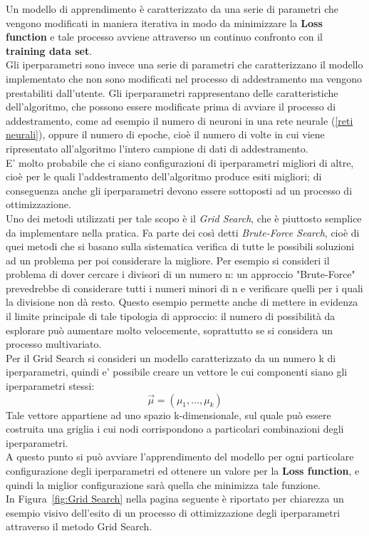 Un modello di apprendimento è caratterizzato da una serie di parametri che vengono modificati in maniera iterativa in modo da minimizzare la \textbf{Loss function} e tale processo avviene attraverso un continuo confronto con il \textbf{training data set}.\\ 
Gli iperparametri sono invece una serie di parametri che caratterizzano il modello implementato che non sono modificati nel processo di addestramento ma vengono prestabiliti dall'utente. Gli iperparametri rappresentano delle caratteristiche dell'algoritmo, che possono essere modificate prima di avviare il processo di addestramento, come ad esempio il numero di neuroni in una rete neurale (\ref{reti neurali}), oppure il numero di epoche, cioè il numero di volte in cui viene ripresentato all'algoritmo l'intero campione di dati di addestramento.\\
E' molto probabile che ci siano configurazioni di iperparametri migliori di altre, cioè per le quali l'addestramento dell'algoritmo produce esiti migliori; di conseguenza anche gli iperparametri devono essere sottoposti ad un processo di ottimizzazione. \\
Uno dei metodi utilizzati per tale scopo è il \textit{Grid Search}, che è piuttosto semplice da implementare nella pratica. Fa parte dei così detti \textit{Brute-Force Search}, cioè di quei metodi che si basano sulla sistematica verifica di tutte le possibili soluzioni ad un problema per poi considerare la migliore. Per esempio si consideri il problema di dover cercare i divisori di un numero n: un approccio "Brute-Force" prevedrebbe di considerare tutti i numeri minori di n e verificare quelli per i quali la divisione non dà resto. Questo esempio permette anche di mettere in evidenza il limite principale di tale tipologia di approccio: il numero di possibilità da esplorare può aumentare molto velocemente, soprattutto se si considera un processo multivariato. \\
Per il Grid Search si consideri un modello caratterizzato da un numero k di iperparametri, quindi e' possibile creare un vettore le cui componenti siano gli iperparametri stessi:
\begin{equation}
\vec{\mu} = (\mu_1,...,\mu_k)
\end{equation}
Tale vettore appartiene ad uno spazio k-dimensionale, sul quale può essere costruita una griglia i cui nodi corrispondono a particolari combinazioni degli iperparametri. \\
A questo punto si può avviare l'apprendimento del modello per ogni particolare configurazione degli iperparametri ed ottenere un valore per la \textbf{Loss function}, e quindi la miglior configurazione sarà quella che minimizza tale funzione. \\
In Figura~\ref{fig:Grid Search} nella pagina seguente è riportato per chiarezza un esempio visivo dell'esito di un processo di ottimizzazione degli iperparametri attraverso il metodo Grid Search.

